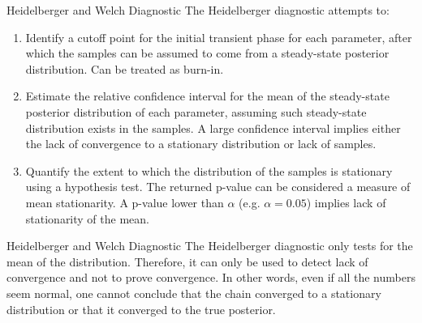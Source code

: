 \begin{frame}{Heidelberger and Welch Diagnostic}
    The Heidelberger diagnostic attempts to:
        \begin{enumerate}
            \item Identify a cutoff point for the initial transient phase for each parameter, after which the samples can be assumed to come from a steady-state posterior distribution. Can be treated as burn-in.
            \item Estimate the relative confidence interval for the mean of the steady-state posterior distribution of each parameter, assuming such steady-state distribution exists in the samples. A large confidence interval implies either the lack of convergence to a stationary distribution or lack of samples.
            \item Quantify the extent to which the distribution of the samples is stationary using a hypothesis test. The returned p-value can be considered a measure of mean stationarity. A p-value lower than $\alpha$ (e.g. $\alpha = 0.05$) implies lack of stationarity of the mean.
        \end{enumerate}
\end{frame}

\begin{frame}{Heidelberger and Welch Diagnostic}
    The Heidelberger diagnostic only tests for the mean of the distribution. Therefore, it can only be used to detect lack of convergence and not to prove convergence. In other words, even if all the numbers seem normal, one cannot conclude that the chain converged to a stationary distribution or that it converged to the true posterior.
\end{frame}


